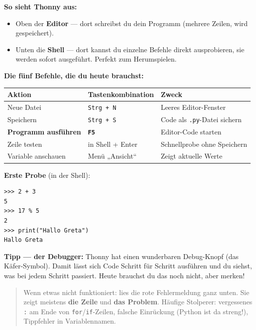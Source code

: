 \textbf{So sieht Thonny aus:}

\begin{itemize}
\item Oben der \textbf{Editor} — dort schreibst du dein Programm
  (mehrere Zeilen, wird gespeichert).
\item Unten die \textbf{Shell} — dort kannst du einzelne Befehle direkt
  ausprobieren, sie werden sofort ausgeführt. Perfekt zum Herumspielen.
\end{itemize}

\textbf{Die fünf Befehle, die du heute brauchst:}

\begin{center}
\begin{tabular}{@{}llp{4.8cm}@{}}
  \toprule
  Aktion & Tastenkombination & Zweck \\
  \midrule
  Neue Datei & \texttt{Strg + N} & Leeres Editor-Fenster \\
  Speichern & \texttt{Strg + S} & Code als \texttt{.py}-Datei sichern \\
  \textbf{Programm ausführen} & \textbf{\texttt{F5}} & Editor-Code starten \\
  Zeile testen & in Shell + Enter & Schnellprobe ohne Speichern \\
  Variable anschauen & Menü „Ansicht“ & Zeigt aktuelle Werte \\
  \bottomrule
\end{tabular}
\end{center}

\textbf{Erste Probe} (in der Shell):

\begin{verbatim}
>>> 2 + 3
5
>>> 17 % 5
2
>>> print("Hallo Greta")
Hallo Greta
\end{verbatim}

\textbf{Tipp — der Debugger:} Thonny hat einen wunderbaren Debug-Knopf
(das Käfer-Symbol). Damit lässt sich Code Schritt für Schritt
ausführen und du siehst, was bei jedem Schritt passiert. Heute brauchst
du das noch nicht, aber merken!

\begin{quote}
Wenn etwas nicht funktioniert: lies die rote Fehlermeldung ganz unten.
Sie zeigt meistens \textbf{die Zeile} und \textbf{das Problem}. Häufige
Stolperer: vergessenes \texttt{:} am Ende von \texttt{for}/\texttt{if}-Zeilen,
falsche Einrückung (Python ist da streng!), Tippfehler in Variablennamen.
\end{quote}

